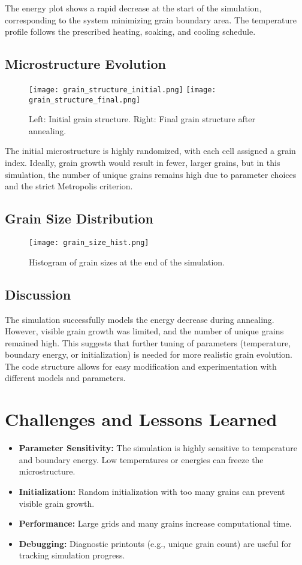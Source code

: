 \documentclass[12pt]{article}
\begin{document}
The energy plot shows a rapid decrease at the start of the simulation, corresponding to the system minimizing grain boundary area. The temperature profile follows the prescribed heating, soaking, and cooling schedule.

\subsection{Microstructure Evolution}
\begin{figure}[h!]
    \centering
    \texttt{[image: grain\_structure\_initial.png]}
    \texttt{[image: grain\_structure\_final.png]}
    \caption{Left: Initial grain structure. Right: Final grain structure after annealing.}
\end{figure}

The initial microstructure is highly randomized, with each cell assigned a grain index. Ideally, grain growth would result in fewer, larger grains, but in this simulation, the number of unique grains remains high due to parameter choices and the strict Metropolis criterion.

\subsection{Grain Size Distribution}
\begin{figure}[h!]
    \centering
    \texttt{[image: grain\_size\_hist.png]}
    \caption{Histogram of grain sizes at the end of the simulation.}
\end{figure}

\subsection{Discussion}
The simulation successfully models the energy decrease during annealing. However, visible grain growth was limited, and the number of unique grains remained high. This suggests that further tuning of parameters (temperature, boundary energy, or initialization) is needed for more realistic grain evolution. The code structure allows for easy modification and experimentation with different models and parameters.

\section{Challenges and Lessons Learned}
\begin{itemize}
    \item \textbf{Parameter Sensitivity:} The simulation is highly sensitive to temperature and boundary energy. Low temperatures or energies can freeze the microstructure.
    \item \textbf{Initialization:} Random initialization with too many grains can prevent visible grain growth.
    \item \textbf{Performance:} Large grids and many grains increase computational time.
    \item \textbf{Debugging:} Diagnostic printouts (e.g., unique grain count) are useful for tracking simulation progress.
\end{itemize}
\end{document}
